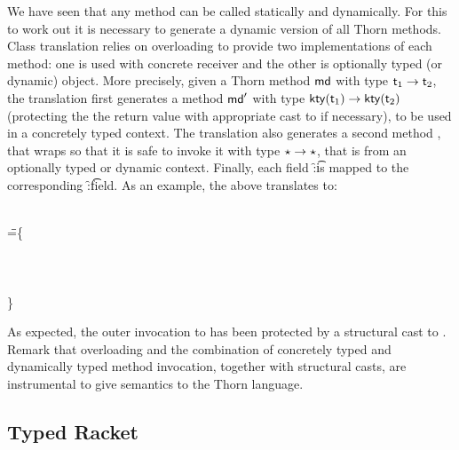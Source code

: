 \documentclass[acmsmall, anonymous, authordraft, review]{acmart} %
\begin{document}
We have seen that any method can be called statically and dynamically. For
this to work out it is necessary to generate a dynamic version of all Thorn
methods.  Class translation relies on overloading to provide two
implementations of each method: one is used with concrete receiver
and the other is
optionally typed (or dynamic) object.  More precisely, given a Thorn method
\(\md\) with type \(\t[1] \to \t[2]\), the \kafka translation first
generates a method \(\mdp\) with type \(\kty{\t[1]} \to \kty{\t[2]}\)
(protecting the the return value with appropriate cast to \kty{\t[2]} if
necessary), to be used in a concretely typed context.  The \kafka
translation also generates a second method \mdpp, that wraps \mdp so that it
is safe to invoke it with type \(\star \to \star\), that is from an optionally
typed or dynamic context.  Finally, each field \f:\t is mapped to the
corresponding \f:\kty\t field.  As an example, the above translates to:

\begin{tabbing}
  \HS
  \KCall{\New \A{}}\n{\SubCast\C{(\KCall{\New\A{}}\m{\SubCast\any{\New\C{}}}\any\any)}}\C\C\
  \\ \HS\HS\HS\HS\HS\HS\HS\HS\HS\HS\HS\HS\HS\HS\HS\HS\HS\HS\HS\HS\HS\HS\HS\HS\HS\HS\HS\HS\HS\HS\HS\HS
\WHERE\HS \K=\HS\=
 \class\= \A \{\\
\>\HS    \Mdef \m\x\any \any{~\x~}\\
\>\HS    \Mdef \n\x\C\C{~\x~}\\
\>\HS    \Mdef \n\x\any\any {\SubCast\any{\KCall\this\n{\SubCast\C\x}\C\C }} \\
\>\}
 \end{tabbing}
\medskip

\noindent As expected, the outer invocation to \n has been protected by a
structural cast to \C.  Remark that \kafka overloading and the combination
of concretely typed and dynamically typed method invocation, together with
structural casts, are instrumental to give semantics to the Thorn language.



\subsection{Typed Racket}
\end{document}
